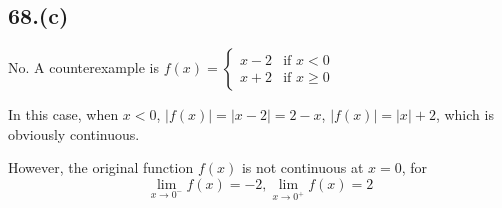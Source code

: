 \documentclass{article}
\begin{document}
\subsection*{68.(c)}

No. A counterexample is $f(x) = \left \{ \begin{array}{ll}
    x - 2 & \textrm{if $x < 0$} \\
    x + 2 & \textrm{if $x \geq 0$}
\end{array} \right.$

In this case, when $x < 0$, $|f(x)| = |x - 2| = 2 - x$, $|f(x)| = |x| + 2$, which is obviously continuous.

However, the original function $f(x)$ is not continuous at $x = 0$, for $$\lim_{x \to 0^-}f(x) = -2, \lim_{x \to 0^+}f(x) = 2$$
\end{document}
